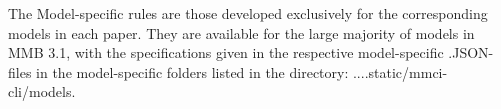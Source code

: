 \documentclass[11pt,a4paper]{article}
\begin{document}
\noindent The Model-specific rules are those developed exclusively for the corresponding models in each paper. They are available for the large majority of  models in MMB 3.1, with the specifications given in the respective model-specific .JSON-files in the model-specific folders listed in the directory: ....static/mmci-cli/models.

\setlength{\bibsep}{0.4\baselineskip}


\end{document}
